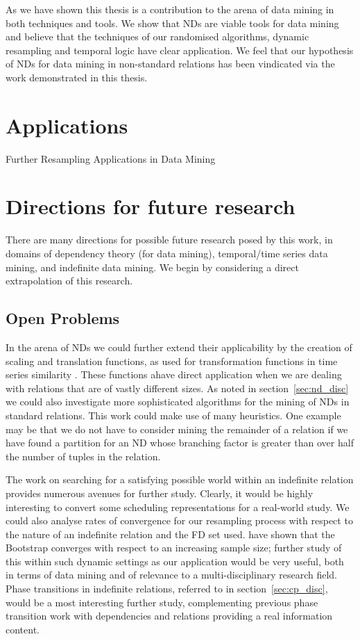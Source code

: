 \medskip

As we have shown this thesis is a contribution to the arena of data
mining in both techniques and tools. We show that NDs are viable tools
for data mining and believe that the techniques of our randomised algorithms,
dynamic resampling and temporal logic have clear application.  We feel
that our hypothesis of NDs for data mining in non-standard relations
has been vindicated via the work demonstrated in this thesis.

\section{Applications}

Further Resampling Applications in Data Mining

\section{Directions for future research}

There are many directions for possible future research posed by this
work, in domains of dependency theory (for data mining), temporal/time
series data mining, and indefinite data mining. We begin by
considering a direct extrapolation of this research.
 
\subsection{Open Problems}

In the arena of NDs we could further extend their applicability by the
creation of scaling and translation functions, as used for
transformation functions in time series similarity
\cite{alss95}. These functions ahave direct application when we are
dealing with relations that are of vastly different sizes. As noted in
section~\ref{sec:nd_disc} we could also investigate more sophisticated
algorithms for the mining of NDs in standard relations. This work
could make use of many heuristics. One example may be that we do not
have to consider mining the remainder of a relation if we have found a
partition for an ND whose branching factor is greater than over half
the number of tuples in the relation.
	
\medskip
The work on searching for a satisfying possible world within an
indefinite relation provides numerous avenues for further
study. Clearly, it would be highly interesting to convert some
scheduling representations for a real-world study. We could also
analyse rates of convergence for our resampling process with respect to the
nature of an indefinite relation and the FD set
used. \cite{efr82,pw93} have shown that the Bootstrap converges with
respect to an increasing sample size; further study of this within
such dynamic settings as our application would be very useful, both in
terms of data mining and of relevance to a multi-disciplinary research
field. Phase transitions in indefinite
relations, referred to in section~\ref{sec:cp_disc}, would be a most
interesting further study, complementing previous 
phase transition work with dependencies and relations providing a real
information content. 

